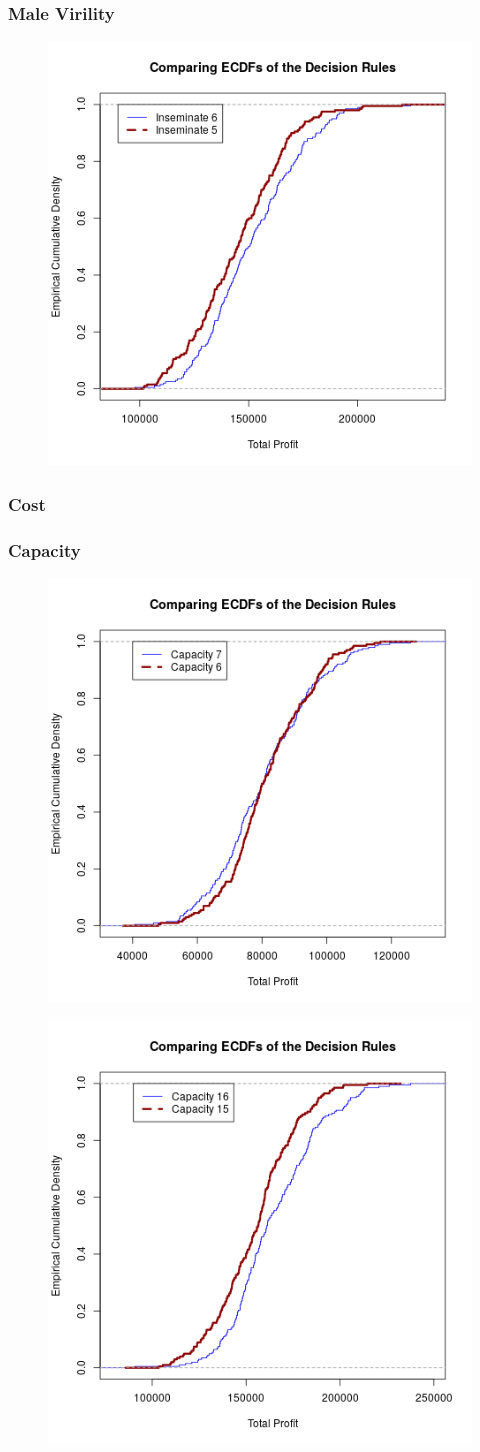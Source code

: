 \documentclass{article}
\begin{document}
		\subsubsection*{Male Virility}
		\begin{figure}[H]
		\centering
		\includegraphics[width=.5\textwidth]{virECDF.png}
		\end{figure}
		\subsubsection*{Cost}
		
		\subsubsection*{Capacity}
		\begin{figure}[H]
		\centering
		\includegraphics[width=.5\textwidth]{capECDF.png}
		\end{figure}
		\begin{figure}[H]
		\centering
		\includegraphics[width=.5\textwidth]{othcapECDF.png}
		\end{figure}
		
		
		



\nocite{*}
\end{document}

